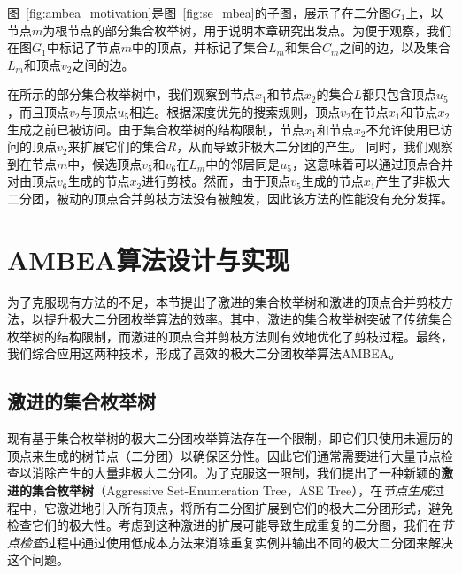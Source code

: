 \begin{example}
  图~\ref{fig:ambea_motivation}是图~\ref{fig:se_mbea}的子图，展示了在二分图$G_1$上，以节点$m$为根节点的部分集合枚举树，用于说明本章研究出发点。为便于观察，我们在图$G_1$中标记了节点$m$中的顶点，并标记了集合$L_m$和集合$C_m$之间的边，以及集合$L_m$和顶点$v_2$之间的边。

  在所示的部分集合枚举树中，我们观察到节点$x_1$和节点$x_2$的集合$L$都只包含顶点$u_5$，而且顶点$v_2$与顶点$u_5$相连。根据深度优先的搜索规则，顶点$v_2$在节点$x_1$和节点$x_2$生成之前已被访问。由于集合枚举树的结构限制，节点$x_1$和节点$x_2$不允许使用已访问的顶点$v_2$来扩展它们的集合$R$，从而导致非极大二分团的产生。
  同时，我们观察到在节点$m$中，候选顶点$v_5$和$v_6$在$L_m$中的邻居同是$u_5$，这意味着可以通过顶点合并对由顶点$v_6$生成的节点$x_2$进行剪枝。然而，由于顶点$v_5$生成的节点$x_1$产生了非极大二分团，被动的顶点合并剪枝方法没有被触发，因此该方法的性能没有充分发挥。

\end{example}

\section{AMBEA算法设计与实现}

为了克服现有方法的不足，本节提出了激进的集合枚举树和激进的顶点合并剪枝方法，以提升极大二分团枚举算法的效率。其中，激进的集合枚举树突破了传统集合枚举树的结构限制，而激进的顶点合并剪枝方法则有效地优化了剪枝过程。最终，我们综合应用这两种技术，形成了高效的极大二分团枚举算法AMBEA。

\subsection{激进的集合枚举树}
\label{subsec:ase}

现有基于集合枚举树的极大二分团枚举算法存在一个限制，即它们只使用未遍历的顶点来生成的树节点（二分团）以确保区分性。因此它们通常需要进行大量节点检查以消除产生的大量非极大二分团。为了克服这一限制，我们提出了一种新颖的\textbf{激进的集合枚举树}（Aggressive Set-Enumeration Tree，ASE Tree），在\textit{节点生成}过程中，它激进地引入所有顶点，将所有二分图扩展到它们的极大二分团形式，避免检查它们的极大性。考虑到这种激进的扩展可能导致生成重复的二分图，我们在\textit{节点检查}过程中通过使用低成本方法来消除重复实例并输出不同的极大二分团来解决这个问题。


